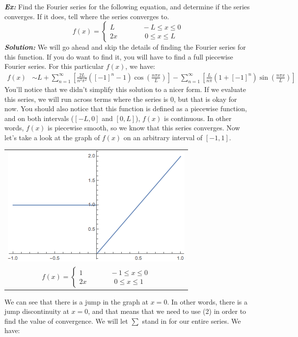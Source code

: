 \documentclass{article}
\begin{document}
\noindent\textbf{\textit{Ex:}} Find the Fourier series for the following equation, and determine if the series converges. If it does, tell where the series converges to.
\[ f(x) =
\begin{cases}
L \qquad\qquad -L \leq x \leq 0\\
2x \qquad\qquad 0 \leq x \leq L
\end{cases}
\]
\indent\textbf{\textit{Solution:}} We will go ahead and skip the details of finding the Fourier series for this function. If you do want to find it, you will have to find a full piecewise Fourier series. For this particular $f(x)$, we have:
\begin{align*}
f(x) &\sim L + \sum_{n=1}^{\infty}\left[\frac{2L}{n^{2}\pi^{2}}([-1]^{n}-1)\cos{\left(\frac{n\pi x}{L}\right)}\right] - \sum_{n=1}^{\infty}\left[\frac{L}{n\pi}(1 + [-1]^{n})\sin{\left(\frac{n\pi x}{L}\right)}\right]
\end{align*}
\noindent You'll notice that we didn't simplify this solution to a nicer form. If we evaluate this series, we will run across terms where the series is 0, but that is okay for now. You should also notice that this function is defined as a piecewise function, and on both intervals ($[-L,0]$ and $[0,L]$), $f(x)$ is continuous. In other words, $f(x)$ is piecewise smooth, so we know that this series converges. Now let's take a look at the graph of $f(x)$ on an arbitrary interval of $[-1,1]$.
\begin{center}
\begin{tabular}{c}
\includegraphics[scale=0.6]{pw_graph_01}\\
$
f(x) =
\begin{cases}
1 \qquad\qquad -1 \leq x \leq 0\\
2x \qquad\qquad 0 \leq x \leq 1
\end{cases}
$
\end{tabular}
\end{center}
\noindent We can see that there is a jump in the graph at $x = 0$. In other words, there is a jump discontinuity at $x = 0$, and that means that we need to use (2) in order to find the value of convergence. We will let $\sum$ stand in for our entire series. We have:
\end{document}
